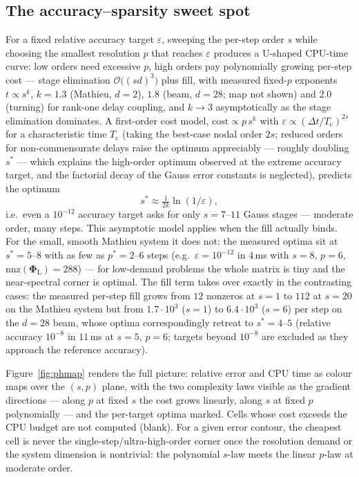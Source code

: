 \documentclass[Afour,sageh,times]{sagej}
\begin{document}
\subsection{The accuracy--sparsity sweet spot}
\label{sec:sweetspot}

For a fixed relative accuracy target $\varepsilon$, sweeping the per-step
order $s$ while choosing the smallest resolution $p$ that reaches
$\varepsilon$ produces a U-shaped CPU-time curve: low orders need excessive
$p$, high orders pay polynomially growing per-step cost --- stage
elimination $\mathcal{O}\bigl((sd)^3\bigr)$ plus fill, with measured
fixed-$p$ exponents $t \propto s^{k}$, $k = 1.3$ (Mathieu, $d=2$), $1.8$
(beam, $d=28$; map not shown) and $2.0$ (turning) for rank-one delay
coupling, and $k \to 3$ asymptotically as the stage elimination dominates. A first-order cost model,
$\mathrm{cost} \propto p\,s^{k}$ with $\varepsilon \propto (\Delta t/T_\mathrm{c})^{2s}$
for a characteristic time $T_\mathrm{c}$ (taking the best-case nodal order
$2s$; reduced orders for non-commensurate delays raise the optimum
appreciably --- roughly doubling $s^\ast$ --- which explains the high-order
optimum observed at the extreme accuracy target, and the factorial decay of
the Gauss error constants is neglected),
predicts the optimum
\begin{equation}
  s^\ast \approx \tfrac{1}{2k}\ln(1/\varepsilon),
  \label{eq:sweetspot}
\end{equation}
i.e.\ even a $10^{-12}$ accuracy target asks for only
$s = 7$--$11$ Gauss stages --- moderate order, many steps. This asymptotic model applies
when the fill actually binds. For the small, smooth Mathieu system it does
not: the measured optima sit at $s^\ast = 5$--$8$ with as few as
$p^\ast = 2$--$6$ steps (e.g.\ $\varepsilon = 10^{-12}$ in $4$\,ms with
$s = 8$, $p = 6$, $\mathrm{nnz}(\mathbf{\Phi}_\mathrm{L}) = 288$) --- for
low-demand problems the whole matrix is tiny and the near-spectral corner is
optimal. The fill term takes over exactly in the contrasting cases:
the measured per-step fill grows from $12$ nonzeros at $s=1$ to $112$ at
$s=20$ on the Mathieu system but from $1.7\cdot10^3$ ($s=1$) to
$6.4\cdot10^3$ ($s=6$) per step on the $d=28$ beam, whose optima
correspondingly retreat to $s^\ast = 4$--$5$ (relative accuracy $10^{-8}$
in $11$\,ms at $s=5$, $p=6$; targets beyond $10^{-8}$ are excluded as they
approach the reference accuracy).

Figure~\ref{fig:phmap} renders the full picture: relative error and CPU time
as colour maps over the $(s, p)$ plane, with the two complexity laws visible
as the gradient directions --- along $p$ at fixed $s$ the cost grows
linearly, along $s$ at fixed $p$ polynomially --- and the per-target optima
marked. Cells whose cost exceeds the CPU budget are not computed (blank).
For a given error contour, the cheapest cell is never the
single-step/ultra-high-order corner once the resolution demand or the system
dimension is nontrivial: the polynomial $s$-law meets the linear $p$-law at
moderate order.
\end{document}
